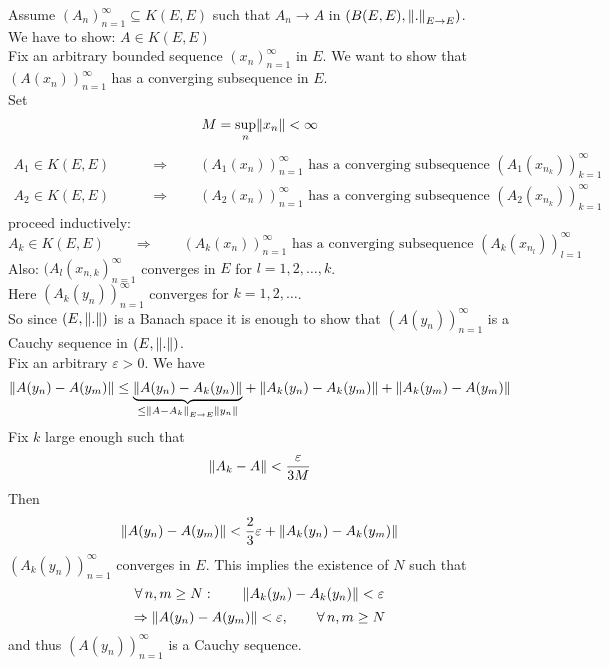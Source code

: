 \begin{beweis}
	Assume $(A_n)_{n=1}^{\infty} \subseteq K(E,E)$ such that $A_n \to A$ in $(B(E,E), \norm{.}_{E \to E})$. \\
	 We have to show: $A \in K(E,E)$ \\
	 Fix an arbitrary bounded sequence $(x_n)_{n=1}^{\infty}$ in $E$. We want to show that $(A(x_n))_{n=1}^{\infty}$ has a converging subsequence in $E$. \\
	 Set \[
	 	M = \sup_{n} \norm{x_n} < \infty
	 \]
	 \begin{align*}
	 	A_1 \in K(E,E) \qquad &\Rightarrow \qquad (A_1(x_n))_{n=1}^{\infty} \text{ has a converging subsequence }(A_1(x _{n_k}))_{k=1}^{\infty} \\
		A_2 \in K(E,E) \qquad &\Rightarrow \qquad (A_2(x_n))_{n=1}^{\infty} \text{ has a converging subsequence }(A_2(x _{n_k}))_{k=1}^{\infty}
	 \end{align*}
	 proceed inductively:
	 \[
	 	A_k \in K(E,E) \qquad \Rightarrow \qquad (A_k(x_n))_{n=1}^{\infty} \text{ has a converging subsequence }(A_k(x _{n_l}))_{l=1}^{\infty}
	 \] 
	 Also: $(A_l(x_{n,k})_{n=1}^{\infty}$ converges in $E$ for $l=1,2,\dots,k$. \\ Here $(A_k(y_n))_{n=1}^{\infty}$ converges for $k=1,2,\dots$. \\
	 So since $(E,\norm{.})$ is a Banach space it is enough to show that $(A(y_n))_{n=1}^{\infty}$ is a Cauchy sequence in $(E,\norm{.})$. \\
	 Fix an arbitrary $\varepsilon >0$. We have
	 \[
	 	\norm{A(y_n)-A(y_m)} \leq \underset{\leq \norm{A-A_k}_{E \to E} \norm{y_n}}{\underbrace{\norm{A(y_n)-A_k(y_n)}}} + \norm{A_k(y_n)- A_k(y_m)} + \norm{A_k(y_m)-A(y_m)}
	 \]
	 Fix $k$ large enough such that
	 \[
	 	\norm{A_k-A} < \frac{\varepsilon}{3M}
	 \]
	 Then 
	 \[
	 	\norm{A(y_n)-A(y_m)} < \frac{2}{3} \varepsilon+ \norm{A_k(y_n)-A_k(y_m)}
	 \]
	 $(A_k(y_n))_{n=1}^{\infty}$ converges in $E$. This implies the existence of $N$ such that
	 \[
	 	\forall\, n,m \geq N: \qquad \norm{A_k(y_n)-A_k(y_n)}< \varepsilon
	 \]
	 \[
	 	\Rightarrow \norm{A(y_n)-A(y_m)} < \varepsilon, \qquad \forall\, n,m \geq N
	 \]
	 and thus $(A(y_n))_{n=1}^{\infty}$ is a Cauchy sequence.
\end{beweis}

